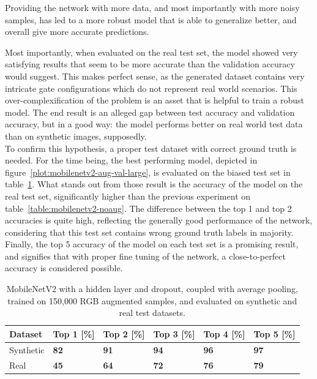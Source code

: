 Providing the network with more data, and most importantly with more noisy
samples, has led to a more robust model that is able to generalize better, and
overall give more accurate predictions.



Most importantly, when evaluated on the real test set, the model showed very
satisfying results that seem to be more accurate than the validation accuracy
would suggest. This makes perfect sense, as the generated dataset contains very
intricate gate configurations which do not represent real world scenarios. This
over-complexification of the problem is an asset that is helpful to train a
robust model. The end result is an alleged gap between test accuracy and
validation accuracy, but in a good way: the model performs better on real
world test data than on synthetic images, supposedly.\\

To confirm this hypothesis, a proper test dataset with correct ground truth is
needed. For the time being, the best performing model, depicted in
figure~\ref{plot:mobilenetv2-aug-val-large}, is evaluated on the biased test
set in table~\ref{table:mobilenetv2-best}. What stands out from those result is
the accuracy of the model on the real test set, significantly higher than the
previous experiment on table~\ref{table:mobilenetv2-noaug}. The difference
between the top 1 and top 2 accuracies is quite high, reflecting the generally
good performance of the network, considering that this test set contains
wrong ground truth labels in majority. Finally, the top 5 accuracy of the model
on each test set is a promising result, and signifies that with proper fine
tuning of the network, a close-to-perfect accuracy is considered possible.

\begin{table}[!h]
    \centering
    \caption[Top-N accuracies for MobileNetV2 on real and synthetic test
    datasets, with image augmentation]{MobileNetV2 with a hidden layer and
    dropout, coupled with average pooling, trained on 150,000 RGB augmented
    samples, and evaluated on synthetic and real test datasets.}
    \begin{tabular}{llllll}
        \toprule
		Dataset & Top 1 [\%] & Top 2 [\%] & Top 3 [\%] & Top 4 [\%] & Top 5 [\%]\\
        \midrule         
        Synthetic & \textbf{82} & \textbf{91} & \textbf{94} & \textbf{96} &
        \textbf{97} \\ 
        Real & \textbf{45} & \textbf{64} & \textbf{72} & \textbf{76} &
        \textbf{79} \\
        \bottomrule
    \end{tabular}
    \label{table:mobilenetv2-best}
\end{table}


